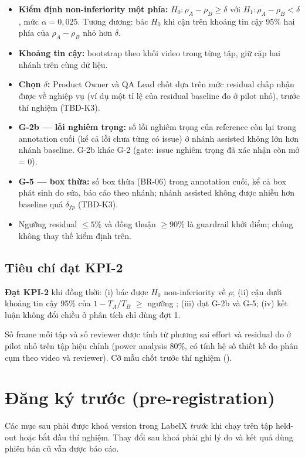 \begin{itemize}
  \item \textbf{Kiểm định non-inferiority một phía:}
        \(H_0: \rho_A - \rho_B \ge \delta\) với \(H_1: \rho_A - \rho_B < \delta\),
        mức \(\alpha = 0{,}025\). Tương đương: bác \(H_0\) khi cận trên khoảng
        tin cậy 95\% hai phía của \(\rho_A - \rho_B\) nhỏ hơn \(\delta\).
  \item \textbf{Khoảng tin cậy:} bootstrap theo khối video trong từng tập, giữ
        cặp hai nhánh trên cùng dữ liệu.
  \item \textbf{Chọn \(\delta\):} Product Owner và QA Lead chốt dựa trên mức
        residual chấp nhận được về nghiệp vụ (ví dụ một tỉ lệ của residual
        baseline đo ở pilot nhỏ), trước thí nghiệm (TBD-K3).
  \item \textbf{G-2b — lỗi nghiêm trọng:} số lỗi nghiêm trọng của reference còn
        lại trong annotation cuối (kể cả lỗi chưa từng có issue) ở nhánh assisted
        không lớn hơn nhánh baseline. G-2b khác G-2 (gate: issue nghiêm trọng đã
        xác nhận còn mở = 0).
  \item \textbf{G-5 — box thừa:} số box thừa (BR-06) trong annotation cuối, kể cả
        box phát sinh do sửa, báo cáo theo nhánh; nhánh assisted không được nhiều
        hơn baseline quá \(\delta_{fp}\) (TBD-K3).
  \item Ngưỡng residual \(\le 5\%\) và đồng thuận \(\ge 90\%\) là guardrail
        khởi điểm; chúng không thay thế kiểm định trên.
\end{itemize}

\subsection{Tiêu chí đạt KPI-2}
\textbf{Đạt KPI-2} khi đồng thời: (i) bác được \(H_0\) non-inferiority về
\(\rho\); (ii) cận dưới khoảng tin cậy 95\% của \(1 - T_A/T_B\) $\ge$ ngưỡng
\TBD[-K2]; (iii) đạt G-2b và G-5; (iv) kết luận không đổi chiều ở phân tích chỉ
dùng đợt 1.

\begin{notebox}[Cỡ mẫu]
Số frame mỗi tập và số reviewer được tính từ phương sai effort và residual đo ở
pilot nhỏ trên tập hiệu chỉnh (power analysis 80\%, có tính hệ số thiết kế do
phân cụm theo video và reviewer). Cỡ mẫu chốt trước thí nghiệm (\TBD[-12]).
\end{notebox}

\section{Đăng ký trước (pre-registration)}
\label{sec:prereg}
Các mục sau phải được khoá version trong LabelX \emph{trước} khi chạy trên tập
held-out hoặc bắt đầu thí nghiệm. Thay đổi sau khoá phải ghi lý do và kết quả
dùng phiên bản cũ vẫn được báo cáo.

